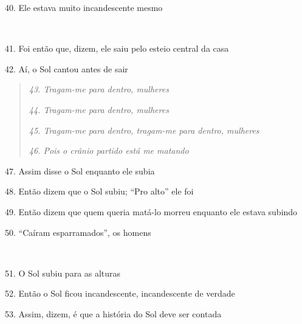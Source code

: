 40. Ele estava muito incandescente mesmo

~

41. Foi então que, dizem, ele saiu pelo esteio central da casa

42. Aí, o Sol cantou antes de sair

\begin{quote}
\forceindent\emph{43. Tragam-me para dentro, mulheres}

\emph{44. Tragam-me para dentro, mulheres}

\emph{45. Tragam-me para dentro, tragam-me para dentro, mulheres}

\emph{46. Pois o crânio partido está me matando}
\end{quote}

47. Assim disse o Sol enquanto ele subia

48. Então dizem que o Sol subiu; ``Pro alto'' ele foi

49. Então dizem que quem queria matá-lo morreu enquanto ele estava subindo

50. ``Caíram esparramados'', os homens

~

51. O Sol subiu para as alturas

52. Então o Sol ficou incandescente, incandescente de verdade

53. Assim, dizem, é que a história do Sol deve ser contada